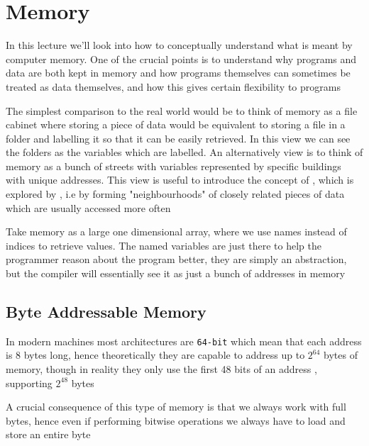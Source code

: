 \section{Memory}

\par{In this lecture we'll look into how to conceptually understand what is meant by computer
memory. One of the crucial points is to understand why programs and data are both kept in memory and how programs themselves can sometimes be treated as data themselves, and how this gives certain
flexibility to programs}
\par{The simplest comparison to the real world would be to think of memory as a file cabinet where
storing a piece of data would be equivalent to storing a file in a folder and labelling it so that
it can be easily retrieved. In this view we can see the folders as the variables which are labelled. An alternatively view is to think of memory as a bunch of streets with variables represented by specific buildings with unique addresses. This view is useful to introduce the concept of , which is explored by , i.e by forming "neighbourhoods" of closely related pieces of data which are usually accessed more often}

\par{Take memory as a large one dimensional array, where we use names instead of indices to retrieve
values. The named variables are just there to help the programmer reason about the program better,
they are simply an abstraction, but the compiler will essentially see it as just a bunch of
addresses in memory} 

\subsection{Byte Addressable Memory}


\par{In modern machines most architectures are \texttt{64-bit} which mean that each address is 8
bytes long, hence theoretically they are capable to address up to $2^64$ bytes of memory, though in
reality they only use the first 48 bits of an address , supporting $2^48$ bytes}
\par{A crucial consequence of this type of memory is that we always work with full bytes, hence
even if performing bitwise operations we always have to load and store an entire byte}


